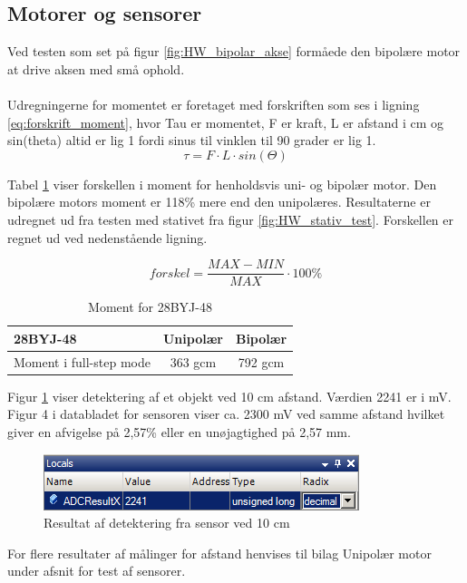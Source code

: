 \subsection{Motorer og sensorer}
Ved testen som set på figur \ref{fig:HW_bipolar_akse} formåede den bipolære motor at drive aksen med små ophold.
\\
\\
Udregningerne for momentet er foretaget med forskriften som ses i ligning \ref{eq:forskrift_moment}, hvor Tau er momentet, F er kraft, L er afstand i cm og sin(theta) altid er lig 1 fordi sinus til vinklen til 90 grader er lig 1.\\

\begin{equation} \label{eq:forskrift_moment}
	\tau = F \cdot L \cdot sin(\Theta)
\end{equation}

\noindent
Tabel \ref{tab:motor_moment} viser forskellen i moment for henholdsvis uni- og bipolær motor. Den bipolære motors moment er 118\% mere end den unipolæres. Resultaterne er udregnet ud fra testen med stativet fra figur \ref{fig:HW_stativ_test}. Forskellen er regnet ud ved nedenstående ligning.

\begin{equation} \label{eq:forskrift_forskel}
	forskel = \frac{MAX - MIN}{MAX} \cdot 100\%
\end{equation}

\begin{table}[H]
  	\centering
	\begin{tabular}{ |l|c|c| }
  		\hline
  		\textbf{28BYJ-48} & Unipolær & Bipolær\\
  		\hline
  		Moment i full-step mode & 363 gcm & 792 gcm \\
  		\hline
	\end{tabular}
	\caption[]{Moment for 28BYJ-48\footnotemark}
	\label{tab:motor_moment}
\end{table}

\noindent
Figur \ref{Sensor_10cm} viser detektering af et objekt ved 10 cm afstand. Værdien 2241 er i mV. Figur 4 i databladet for sensoren viser ca. 2300 mV ved samme afstand hvilket giver en afvigelse på 2,57\% eller en unøjagtighed på 2,57 mm.

\begin{figure}[H]
	\includegraphics[scale=1]{tex/Test/Motor-sensor/Sensor_10cm.png}
	\caption{Resultat af detektering fra sensor ved 10 cm}
	\label{Sensor_10cm}
\end{figure}

\noindent
For flere resultater af målinger for afstand henvises til bilag Unipolær motor under afsnit for test af sensorer.